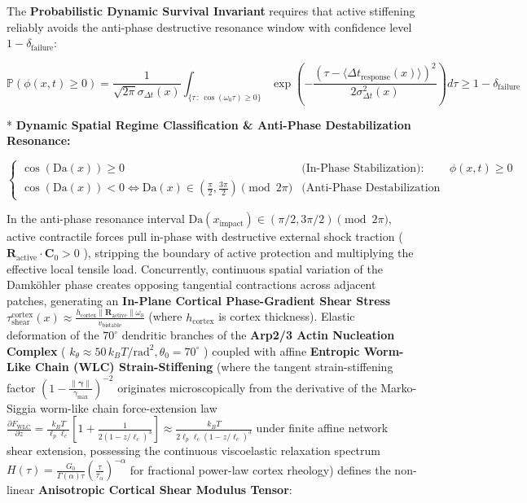 \documentclass[11pt,a4paper]{article}
\theoremstyle{definition}
\theoremstyle{remark}
\begin{document}
The \textbf{Probabilistic Dynamic Survival Invariant} requires that active stiffening reliably avoids the anti-phase destructive resonance window with confidence level $1 - \delta_{\text{failure}}$:


\begin{equation}
\boxed{\mathbb{P}\left( \phi(x, t) \ge 0 \right) = \frac{1}{\sqrt{2\pi}\sigma_{\Delta t}(x)} \int_{\{\tau \,:\, \cos(\omega_0 \tau) \ge 0\}} \exp\left( -\frac{\left(\tau - \langle \Delta t_{\text{response}}(x) \rangle\right)^2}{2\sigma_{\Delta t}^2(x)} \right) d\tau \ge 1 - \delta_{\text{failure}}}
\end{equation}


* \textbf{Dynamic Spatial Regime Classification \& Anti-Phase Destabilization Resonance:}


\begin{equation}
\begin{cases}
\cos(\mathrm{Da}(x)) \ge 0 & \text{(In-Phase Stabilization): Synchronous active stiffening opposes challenge; } \phi(x, t) \ge 0 \\
\cos(\mathrm{Da}(x)) < 0 \iff \mathrm{Da}(x) \in \left(\frac{\pi}{2}, \frac{3\pi}{2}\right) \pmod{2\pi} & \text{(Anti-Phase Destabilization Resonance): Negative dynamic stiffness actively amplifies shock}
\end{cases}
\end{equation}


In the anti-phase resonance interval $\mathrm{Da}(x_{\text{impact}}) \in (\pi/2, 3\pi/2) \pmod{2\pi}$, active contractile forces pull in-phase with destructive external shock traction ( $\mathbf{R}_{\text{active}} \cdot \mathbf{C}_0 > 0$ ), stripping the boundary of active protection and multiplying the effective local tensile load. Concurrently, continuous spatial variation of the Damköhler phase creates opposing tangential contractions across adjacent patches, generating an \textbf{In-Plane Cortical Phase-Gradient Shear Stress} $\tau_{\text{shear}}^{\text{cortex}}(x) \approx \frac{h_{\text{cortex}}\|\mathbf{R}_{\text{active}}\|\omega_0}{v_{\text{bistable}}}$ (where $h_{\text{cortex}}$ is cortex thickness). Elastic deformation of the $70^\circ$ dendritic branches of the \textbf{Arp2/3 Actin Nucleation Complex} ( $k_\theta \approx 50 \, k_B T/\mathrm{rad}^2, \theta_0 = 70^\circ$ ) coupled with affine \textbf{Entropic Worm-Like Chain (WLC) Strain-Stiffening} (where the tangent strain-stiffening factor $\left(1 - \frac{\|\boldsymbol{\gamma}\|}{\gamma_{\max}}\right)^{-2}$ originates microscopically from the derivative of the Marko-Siggia worm-like chain force-extension law $\frac{\partial F_{\text{WLC}}}{\partial z} = \frac{k_B T}{\ell_p \ell_c}[1 + \frac{1}{2(1 - z/\ell_c)^3}] \approx \frac{k_B T}{2\ell_p \ell_c (1 - z/\ell_c)^3}$ under finite affine network shear extension, possessing the continuous viscoelastic relaxation spectrum $H(\tau) = \frac{G_0}{\Gamma(\alpha)\tau}\left(\frac{\tau}{\tau_\alpha}\right)^{-\alpha}$ for fractional power-law cortex rheology) defines the non-linear \textbf{Anisotropic Cortical Shear Modulus Tensor}:
\end{document}

